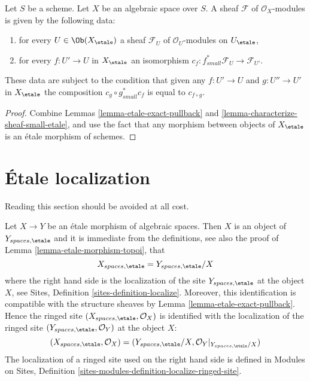 \begin{lemma}
\label{lemma-characterize-module-small-etale}
Let $S$ be a scheme. Let $X$ be an algebraic space over $S$.
A sheaf $\mathcal{F}$ of $\mathcal{O}_X$-modules is given by the following
data:
\begin{enumerate}
\item for every $U \in \Ob(X_\etale)$ a sheaf
$\mathcal{F}_U$ of $\mathcal{O}_U$-modules on $U_\etale$,
\item for every $f : U' \to U$ in $X_\etale$ an isomorphism
$c_f : f_{small}^*\mathcal{F}_U \to \mathcal{F}_{U'}$.
\end{enumerate}
These data are subject to the condition that given any $f : U' \to U$
and $g : U'' \to U'$ in $X_\etale$ the composition
$c_g \circ g_{small}^*c_f$ is equal to $c_{f \circ g}$.
\end{lemma}

\begin{proof}
Combine Lemmas \ref{lemma-etale-exact-pullback}
and \ref{lemma-characterize-sheaf-small-etale}, and use the fact that
any morphism between objects of $X_\etale$ is an \'etale morphism
of schemes.
\end{proof}







\section{\'Etale localization}
\label{section-localize}

\noindent
Reading this section should be avoided at all cost.

\medskip\noindent
Let $X \to Y$ be an \'etale morphism of algebraic spaces.
Then $X$ is an object of $Y_{spaces, \etale}$ and it is
immediate from the definitions, see also the proof of
Lemma \ref{lemma-etale-morphism-topoi},
that
\begin{equation}
\label{equation-localize}
X_{spaces, \etale} = Y_{spaces, \etale}/X
\end{equation}
where the right hand side is the localization of the site
$Y_{spaces, \etale}$ at the object $X$, see
Sites, Definition \ref{sites-definition-localize}.
Moreover, this identification is compatible with the structure sheaves by
Lemma \ref{lemma-etale-exact-pullback}.
Hence the ringed site $(X_{spaces, \etale}, \mathcal{O}_X)$
is identified with the localization of the ringed site
$(Y_{spaces, \etale}, \mathcal{O}_Y)$ at the object $X$:
\begin{equation}
\label{equation-localize-ringed}
(X_{spaces, \etale}, \mathcal{O}_X) =
(Y_{spaces, \etale}/X, \mathcal{O}_Y|_{Y_{spaces, \etale}/X})
\end{equation}
The localization of a ringed site used on the right hand side is defined in
Modules on Sites,
Definition \ref{sites-modules-definition-localize-ringed-site}.

